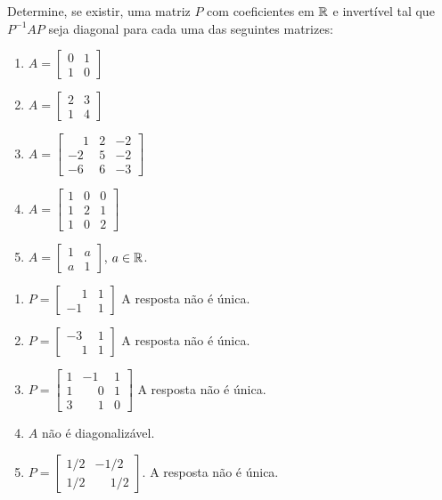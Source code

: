 \documentclass[12pt]{exam}
\begin{document}
\begin{exercicio}
  Determine, se existir, uma matriz $P$ com coeficientes em $\mathbb{R}$ e invertível tal que $P^{-1}AP$ seja diagonal para cada uma das seguintes matrizes:
    \begin{enumerate}[label=({\alph*})]
      \item $A = \begin{bmatrix} 0 & 1\\ 1 & 0\end{bmatrix}$
      \item $A = \begin{bmatrix} 2 & 3\\ 1 & 4\end{bmatrix}$
      \item $A = \begin{bmatrix} \phantom{-} 1 & 2 & -2\\ -2 & 5 & -2\\ -6 & 6 & -3\end{bmatrix}$
      \item $A = \begin{bmatrix} 1 & 0 & 0\\ 1 & 2 & 1\\ 1 & 0 & 2\end{bmatrix}$
      \item $A = \begin{bmatrix} 1 & a \\ a & 1\end{bmatrix}$, $a \in \mathbb{R}$.
    \end{enumerate}
    \begin{solucao}
      \begin{enumerate}[label=({\alph*})]
        \item $P = \begin{bmatrix}
          \phantom{-} 1 & 1\\ -1 & 1
        \end{bmatrix}$ A resposta não é única.
        \item $P = \begin{bmatrix}
          -3 & 1\\ \phantom{-} 1 & 1
        \end{bmatrix}$ A resposta não é única.
        \item $P = \begin{bmatrix}
          1 & -1 & 1\\ 1 & \phantom{-} 0 & 1\\ 3 & \phantom{-} 1 & 0
        \end{bmatrix}$ A resposta não é única.
        \item $A$ não é diagonalizável.
        \item $P = \begin{bmatrix} 1/2 & -1/2\\ 1/2 & \phantom{-} 1/2\end{bmatrix}$. A resposta não é única.
      \end{enumerate}
    \end{solucao}

\end{exercicio}
\end{document}
